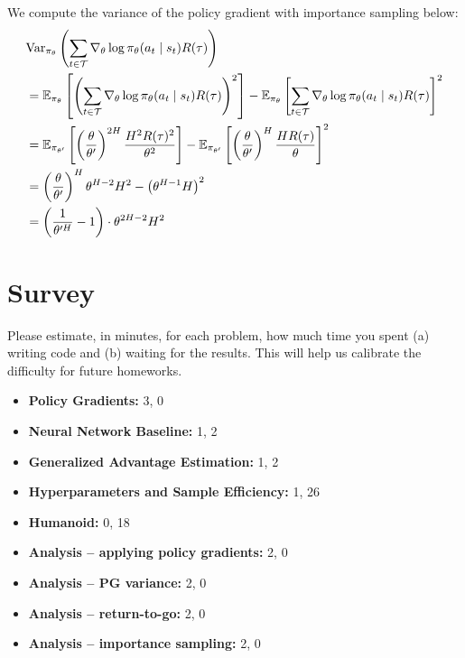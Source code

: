 \documentclass{article}
\begin{document}
\begin{enumerate}
\begin{enumerate}
    \begin{sol}
        We compute the variance of the policy gradient with importance sampling below:
        \begin{align*}
            &\text{Var}_{\pi_\theta}\left(\sum_{t \in \mathcal{T}} \nabla_\theta \log \pi_\theta(a_t \mid s_t) R(\tau)\right) \\
            &= \mathbb{E}_{\pi_\theta} \left[\left(\sum_{t \in \mathcal{T}} \nabla_\theta \log \pi_\theta(a_t \mid s_t) R(\tau)\right)^2\right] - \mathbb{E}_{\pi_\theta}\left[\sum_{t \in \mathcal{T}} \nabla_\theta \log \pi_\theta(a_t \mid s_t) R(\tau)\right]^2 \\
            &= \mathbb{E}_{\pi_{\theta'}}\left[\left(\frac{\theta}{\theta'}\right)^{2H} \frac{H^2 R(\tau)^2}{\theta^2}\right] - \mathbb{E}_{\pi_{\theta'}}\left[\left(\frac{\theta}{\theta'}\right)^{H} \frac{HR(\tau)}{\theta}\right]^2 \\
            &= \left(\frac{\theta}{\theta'}\right)^{H} \theta^{H - 2} H^2 - \left(\theta^{ H - 1}H\right)^2 \\
            &= \left(\frac{1}{\theta'^H} - 1\right) \cdot \theta^{2H - 2}H^2
        \end{align*}
    \end{sol}

\end{enumerate}

\end{enumerate}

\newpage\section{Survey}
\label{sec:survey}
Please estimate, in minutes, for each problem, how much time you spent (a) writing code and (b) waiting for the results. This will help us calibrate the difficulty for future homeworks. 
\begin{itemize}
    \item \textbf{Policy Gradients:} 3, 0
    \item \textbf{Neural Network Baseline:} 1, 2
    \item \textbf{Generalized Advantage Estimation:} 1, 2
    \item \textbf{Hyperparameters and Sample Efficiency:} 1, 26
    \item \textbf{Humanoid:} 0, 18
    \item \textbf{Analysis -- applying policy gradients:} 2, 0
    \item \textbf{Analysis -- PG variance:} 2, 0
    \item \textbf{Analysis -- return-to-go:} 2, 0
    \item \textbf{Analysis -- importance sampling:} 2, 0
\end{itemize}
\end{document}

